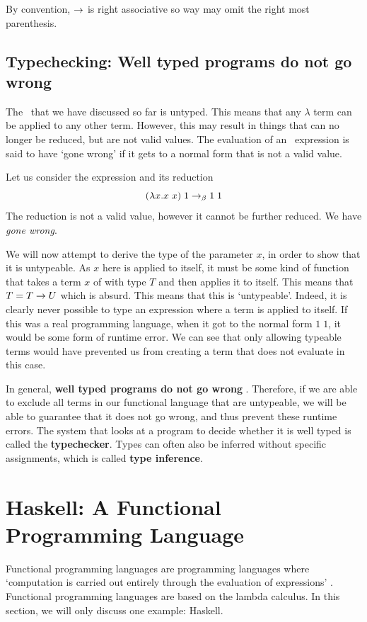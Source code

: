 By convention, $\rightarrow$ is right associative so way may omit the right most parenthesis. 

\subsection{Typechecking: Well typed programs do not go wrong}
The \lcalc\ that we have discussed so far is untyped. This means that any $\lambda$ term can be applied to any other term. However, this may result in things that can no longer be reduced, but are not valid values. The evaluation of an \lcalc\ expression is said to have `gone wrong' if it gets to a normal form that is not a valid value.

Let us consider the expression and its reduction
\[
(\lambda x. x\;x) \;1 \rightarrow_\beta 1\;1
\]
\noindent The reduction is not a valid value, however it cannot be further reduced. We have \textit{gone wrong}.

We will now attempt to derive the type of the parameter $x$, in order to show that it is untypeable.
As $x$ here is applied to itself, it must be some kind of function that takes a term $x$ of with type $T$ and then applies it to itself. This means that $T = T \rightarrow U$ which is absurd. This means that this is `untypeable'. Indeed, it is clearly never possible to type an expression where a term is applied to itself. If this was a real programming language, when it got to the normal form \(1\;1\), it would be some form of runtime error. We can see that only allowing typeable terms would have prevented us from creating a term that does not evaluate in this case. 

In general, \textbf{well typed programs do not go wrong} \cite{MILNER1978348}. Therefore, if we are able to exclude all terms in our functional language that are untypeable, we will be able to guarantee that it does not go wrong, and thus prevent these runtime errors. The system that looks at a program to decide whether it is well typed is called the \textbf{typechecker}. Types can often also be inferred without specific assignments, which is called \textbf{type inference}.

\section{Haskell: A Functional Programming Language}
Functional programming languages are programming languages where `computation is carried out entirely through the evaluation of expressions' \cite{hudak1989conceptionfunctionalprogranning}. Functional programming languages are based on the lambda calculus. In this section, we will only discuss one example: Haskell. 

